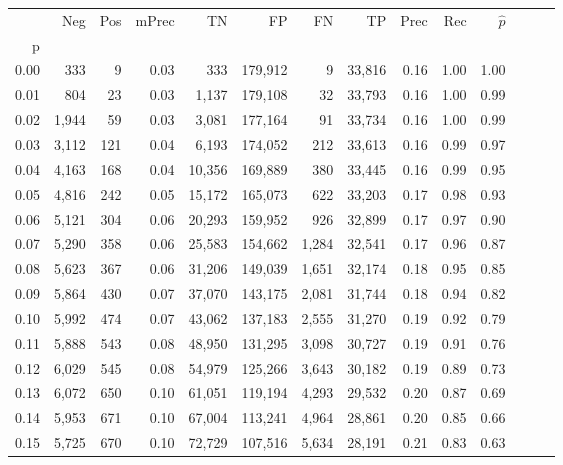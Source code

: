 \begin{tabular}{rrrrrrrrrrrrrr}
\toprule
{} &    Neg &  Pos & mPrec &       TN &       FP &      FN &      TP &  Prec &   Rec & $\hat{p}$ \\
p    &        &      &       &          &          &         &         &       &       &           \\
\midrule
0.00 &    333 &    9 &  0.03 &      333 &  179,912 &       9 &  33,816 &  0.16 &  1.00 &      1.00 \\
0.01 &    804 &   23 &  0.03 &    1,137 &  179,108 &      32 &  33,793 &  0.16 &  1.00 &      0.99 \\
0.02 &  1,944 &   59 &  0.03 &    3,081 &  177,164 &      91 &  33,734 &  0.16 &  1.00 &      0.99 \\
0.03 &  3,112 &  121 &  0.04 &    6,193 &  174,052 &     212 &  33,613 &  0.16 &  0.99 &      0.97 \\
0.04 &  4,163 &  168 &  0.04 &   10,356 &  169,889 &     380 &  33,445 &  0.16 &  0.99 &      0.95 \\
0.05 &  4,816 &  242 &  0.05 &   15,172 &  165,073 &     622 &  33,203 &  0.17 &  0.98 &      0.93 \\
0.06 &  5,121 &  304 &  0.06 &   20,293 &  159,952 &     926 &  32,899 &  0.17 &  0.97 &      0.90 \\
0.07 &  5,290 &  358 &  0.06 &   25,583 &  154,662 &   1,284 &  32,541 &  0.17 &  0.96 &      0.87 \\
0.08 &  5,623 &  367 &  0.06 &   31,206 &  149,039 &   1,651 &  32,174 &  0.18 &  0.95 &      0.85 \\
0.09 &  5,864 &  430 &  0.07 &   37,070 &  143,175 &   2,081 &  31,744 &  0.18 &  0.94 &      0.82 \\
0.10 &  5,992 &  474 &  0.07 &   43,062 &  137,183 &   2,555 &  31,270 &  0.19 &  0.92 &      0.79 \\
0.11 &  5,888 &  543 &  0.08 &   48,950 &  131,295 &   3,098 &  30,727 &  0.19 &  0.91 &      0.76 \\
0.12 &  6,029 &  545 &  0.08 &   54,979 &  125,266 &   3,643 &  30,182 &  0.19 &  0.89 &      0.73 \\
0.13 &  6,072 &  650 &  0.10 &   61,051 &  119,194 &   4,293 &  29,532 &  0.20 &  0.87 &      0.69 \\
0.14 &  5,953 &  671 &  0.10 &   67,004 &  113,241 &   4,964 &  28,861 &  0.20 &  0.85 &      0.66 \\
0.15 &  5,725 &  670 &  0.10 &   72,729 &  107,516 &   5,634 &  28,191 &  0.21 &  0.83 &      0.63 \\

\end{tabular}
